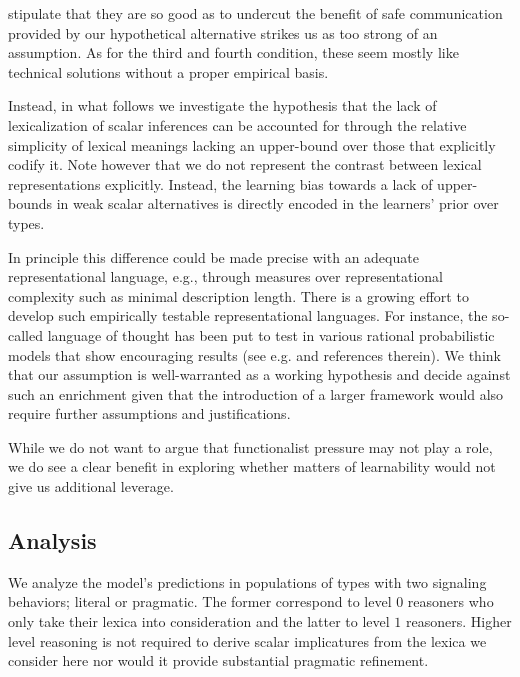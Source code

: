 \documentclass[a4paper]{article}
\begin{document}
stipulate that they are so good as to undercut the benefit of safe communication provided by our hypothetical alternative strikes us as too strong of an assumption.  As for the third and fourth condition, these seem mostly like technical solutions without a proper empirical basis. 

Instead, in what follows we investigate the hypothesis that the lack of lexicalization of scalar inferences can be accounted for through the relative simplicity of lexical meanings lacking an upper-bound over those that explicitly codify it. Note however that we do not represent the contrast between lexical representations explicitly. Instead, the learning bias towards a lack of upper-bounds in weak scalar alternatives is directly encoded in the learners' prior over types.

 In principle this difference could be made precise with an adequate representational language, e.g., through measures over representational complexity such as minimal description length.  There is a growing effort to develop such empirically  testable  representational  languages. For  instance, the so-called language of thought has been put to test in various rational probabilistic models that show encouraging results (see e.g. \citealt{katz+etal:2008, piantadosi+etal:underreview, piantadosi+etal:2012} and references therein). We think that our assumption is well-warranted as a working hypothesis and decide against such an enrichment given that the introduction of a larger framework would also require further assumptions and justifications. 
 
While we do not want to argue that functionalist pressure may not play a role, we do see a clear benefit in exploring whether matters of learnability would not give us additional leverage.

\subsection{Analysis}
We analyze the model's predictions in populations of types with two signaling behaviors; literal or pragmatic. The former correspond to level $0$ reasoners who only take their lexica into consideration and the latter to level $1$ reasoners. Higher level reasoning is not required to derive scalar implicatures from the lexica we consider here nor would it provide substantial pragmatic refinement.
\end{document}
